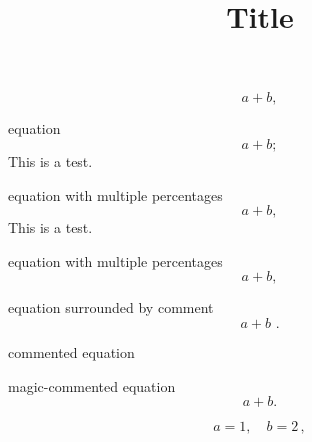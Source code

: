 \documentclass[12pt]{article}
\title{Title}
\author{}
\date{}
\begin{document}


\begin{equation}
  a+b
  ,
\end{equation}


equation
\begin{equation}
  a+b    ;
\end{equation}
This is a test.


equation with multiple percentages
%
%
\begin{equation}
  a+b,
\end{equation}
%
This is a test.

equation with multiple percentages
%
%
\begin{equation}
  a+b  ,
\end{equation}
%
%


equation surrounded by comment
%
\begin{equation}
  a+b 
  \,\, .
\end{equation}
%


commented equation


magic-commented equation
\begin{equation}
    a+b.
\end{equation}


\begin{equation}
    a=1, 
    \quad b=2
    \, ,
\end{equation}
\end{document}

